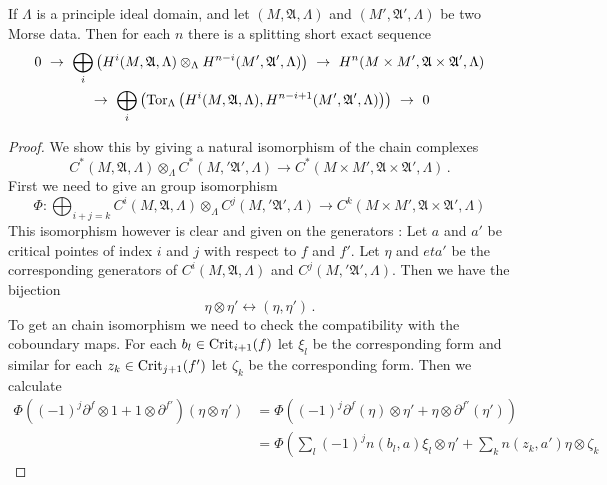 \begin{theorem}
		If $\Lambda$ is a principle ideal domain, and let $(M,\mathfrak{A},\Lambda)$ and $(M',\mathfrak{A}',\Lambda)$ be two Morse data. Then for each $n$ there is a splitting short exact sequence 
	\begin{multline*}
		0~\to ~
		\bigoplus_i\left(H^i(M,\mathfrak{A},\Lambda)\otimes_\Lambda H^{n-i}(M',\mathfrak{A}',\Lambda)\right) ~\to~
		H^n(M\times M',\mathfrak{A}\times \mathfrak{A}',\Lambda) \\
		~	\to ~
		\bigoplus_i\left(\operatorname{\mathrm{Tor}}_{\Lambda}\left(
		H^i(M,\mathfrak{A},\Lambda),H^{n-i+1}(M',\mathfrak{A}',\Lambda)
		\right) \right)~ \to ~0
	\end{multline*}
\end{theorem}
\begin{proof}
	We show this by giving a natural isomorphism of the chain complexes 
	\begin{equation*}
		C^*(M,\mathfrak{A},\Lambda)\otimes_\Lambda C^*(M,'\mathfrak{A}',\Lambda) \to C^*(M\times M',\mathfrak{A}\times \mathfrak{A}',\Lambda) \,.
	\end{equation*}
	First we need to give an group isomorphism 
	\begin{equation*}
		\Phi: \bigoplus_{i+j=k}C^i(M,\mathfrak{A},\Lambda)\otimes_\Lambda C^j(M,'\mathfrak{A}',\Lambda) \to C^k(M\times M',\mathfrak{A}\times \mathfrak{A}',\Lambda)
	\end{equation*} This isomorphism however is clear and given on the generators : Let $a$ and $a'$ be critical pointes of index $i$ and $j$ with respect to $f$ and $f'$. Let $\eta$ and $eta'$ be the corresponding generators of $C^i(M,\mathfrak{A},\Lambda)$ and $C^j(M,'\mathfrak{A}',\Lambda)$. Then we have the bijection 
	\begin{equation*}
		\eta \otimes \eta' \leftrightarrow (\eta,\eta')\,.
	\end{equation*} To get an chain isomorphism we need to check the compatibility with the coboundary maps. For each $b_l\in \mathrm{Crit}_{i+1}(f)$ let $\xi_l$ be the corresponding form and similar for each $z_k\in \mathrm{Crit}_{j+1}(f')$ let $\zeta_k$ be the corresponding form. Then we calculate
	\begin{align*}
	\Phi\left(
	(-1)^j \partial^f\otimes 1+1\otimes \partial^{f'}
	\right) (\eta \otimes \eta')
	&= \Phi\left(
	(-1)^j \partial^f(\eta)\otimes \eta'+\eta\otimes \partial^{f'}(\eta')
	\right)\\
		&= \Phi\left(
	\sum_{l}(-1)^j n(b_l,a)\xi_l \otimes \eta'+\sum_k n(z_k,a')\eta\otimes \zeta_k

\end{align*}
\end{proof}
